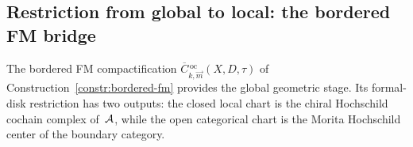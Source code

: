 \subsection{Restriction from global to local: the bordered FM bridge}
\label{subsec:thqg-bordered-fm-bridge}

The bordered FM compactification
$\overline{C}{}^{\,\mathrm{oc}}_{k,\vec{m}}(X, D, \tau)$
of Construction~\ref{constr:bordered-fm} provides the global
geometric stage. Its formal-disk restriction has two outputs:
the closed local chart is the chiral Hochschild cochain complex
of~$\mathcal{A}$, while the open categorical chart is the Morita
Hochschild center of the boundary category.

